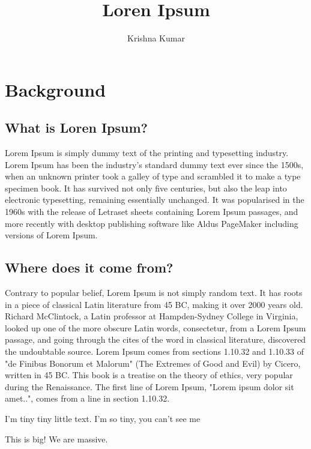 \documentclass[11pt]{article}
\title{Loren Ipsum} %
\author{Krishna Kumar} %
\begin{document}
\maketitle

\section{Background} %
\subsection{What is Loren Ipsum?} %

Lorem Ipsum is simply dummy text of the printing and typesetting industry. 
Lorem Ipsum has been the industry's standard dummy text ever since the 1500s, 
when an unknown printer took a galley of type and scrambled it to make a type 
specimen book. It has survived not only five centuries, but also the leap into 
electronic typesetting, remaining essentially unchanged. It was popularised in 
the 1960s with the release of Letraset sheets containing Lorem Ipsum passages, 
and more recently with desktop publishing software like Aldus PageMaker 
including versions of Lorem Ipsum.


\subsection{Where does it come from?}  %

Contrary to popular belief, Lorem Ipsum is not simply random text. It has roots 
in a piece of classical Latin literature from 45 BC, making it over 2000 years 
old. Richard McClintock, a Latin professor at Hampden-Sydney College in 
Virginia, looked up one of the more obscure Latin words, consectetur, from a 
Lorem Ipsum passage, and going through the cites of the word in classical 
literature, discovered the undoubtable source. Lorem Ipsum comes from sections 
1.10.32 and 1.10.33 of "de Finibus Bonorum et Malorum" (The Extremes of Good 
and Evil) by Cicero, written in 45 BC. This book is a treatise on the theory of 
ethics, very popular during the Renaissance. The first line of Lorem Ipsum, 
"Lorem ipsum dolor sit amet..", comes from a line in section 1.10.32.



\tiny I'm tiny tiny little text. I'm so tiny, you can't see me

\Huge This is big! We are massive.
\end{document}
